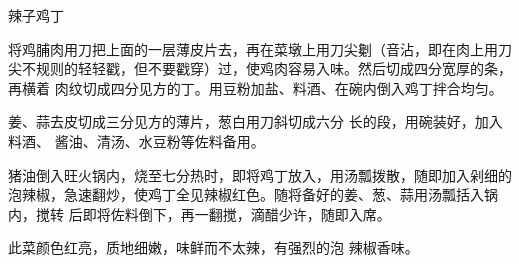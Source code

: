 \begin{recipe}{辣子鸡丁}

\ingredients



\preparation

\step 将鸡脯肉用刀把上面的一层薄皮片去，再在菜墩上用刀尖劖（音沾，即在肉上用刀
尖不规则的轻轻戳，但不要戳穿）过，使鸡肉容易入味。然后切成四分宽厚的条，再横着
肉纹切成四分见方的丁。用豆粉加盐、料酒、在碗内倒入鸡丁拌合均匀。

姜、蒜去皮切成三分见方的薄片，葱白用刀斜切成六分 长的段，用碗装好，加入料酒、
酱油、清汤、水豆粉等佐料备用。

\step 猪油倒入旺火锅内，烧至七分热时，即将鸡丁放入，用汤瓢拨散，随即加入剁细的
泡辣椒，急速翻炒，使鸡丁全见辣椒红色。随将备好的姜、葱、蒜用汤瓢括入锅内，搅转
后即将佐料倒下，再一翻搅，滴醋少许，随即入席。

\features

此菜颜色红亮，质地细嫩，味鲜而不太辣，有强烈的泡 辣椒香味。

\end{recipe}

